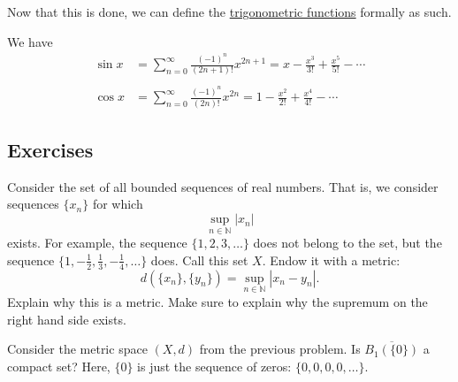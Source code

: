   Now that this is done, we can define the \hyperref[def:trigonometric-functions]{trigonometric functions} formally as such. 

  \begin{definition}
    \label{def:trigonometric-functions}
    We have 
    \begin{align}
      \sin x&=\sum_{n=0}^{\infty}\frac{(-1)^n}{(2n+1)!}x^{2n+1}=x-\frac{x^3}{3!}+\frac{x^5}{5!}-\cdots
      \\\\
      \cos x&=\sum_{n=0}^{\infty}\frac{(-1)^n}{(2n)!}x^{2n}=1-\frac{x^2}{2!}+\frac{x^4}{4!}-\cdots
    \end{align}
  \end{definition}

\subsection{Exercises}

  \begin{exercise}
    Consider the set of all bounded sequences of real numbers. That is, we
    consider sequences $\{x_n\}$ for which
    \begin{equation}
      \sup_{n\in\mathbb{N}} |x_n|
    \end{equation}
    exists. For example, the sequence $\{1,2,3,\ldots\}$ does not belong to the set,
    but the sequence $\{1,-\frac{1}{2},\frac{1}{3},-\frac{1}{4},\ldots\}$ does. Call this set $X$. Endow it with
    a metric:
    \begin{equation}
      d(\{x_n\},\{y_n\}) = \sup_{n\in\mathbb{N}} |x_n - y_n|.
    \end{equation}
    Explain why this is a metric. Make sure to explain why the supremum on
    the right hand side exists.
  \end{exercise}
  \begin{solution}
    
  \end{solution}

  \begin{exercise}
    Consider the metric space $(X,d)$ from the previous problem. Is $\overline{B_1(\{0\})}$
    a compact set? Here, $\{0\}$ is just the sequence of zeros: $\{0,0,0,0,\ldots\}$.
  \end{exercise}
  \begin{solution}
    
  \end{solution}

